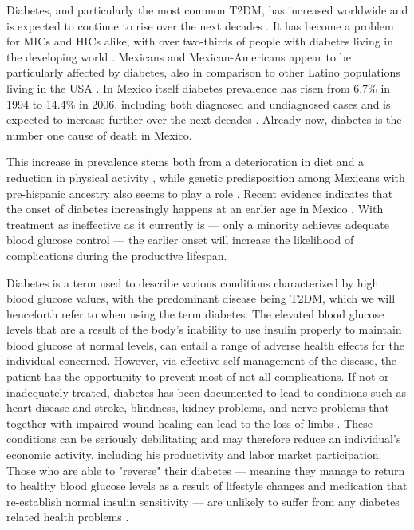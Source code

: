 \documentclass[12pt,english]{article}
\begin{document}
Diabetes, and particularly the most common \ac{T2DM}, has increased worldwide and is expected to continue to rise over the next decades \parencite{Risk2016}. It has become a problem for \ac{MICs} and \ac{HICs} alike, with over two-thirds of people with diabetes living in the developing world \parencite{InternationalDiabetesFederation2013}. Mexicans and Mexican-Americans appear to be particularly affected by diabetes, also in comparison to other Latino populations living in the \ac{USA} \parencite{Schneiderman2014}. In Mexico itself diabetes prevalence has risen from 6.7\% in 1994 to 14.4\% in 2006, including both diagnosed and undiagnosed cases \parencite{Barquera2013} and is expected to increase further over the next decades \parencite{Meza2015}. Already now, diabetes is the number one cause of death in Mexico. 

This increase in prevalence stems both from a deterioration in diet and a reduction in physical activity \parencite{Barquera2008b,Basu2013}, while genetic predisposition among Mexicans with pre-hispanic ancestry also seems to play a role \parencite{Williams2013}. Recent evidence indicates that the onset of diabetes increasingly happens at an earlier age in Mexico \parencite{Villalpando2010}. With treatment as ineffective as it currently is --- only a minority achieves adequate blood glucose control  \parencite{Barquera2013} --- the earlier onset will increase the likelihood of complications during the productive lifespan. 

Diabetes is a term used to describe various conditions characterized by high blood glucose values, with the predominant disease being \ac{T2DM}, which we will henceforth refer to when using the term diabetes. The elevated
blood glucose levels that are a result of the body's inability to use insulin properly to maintain blood glucose at normal levels, can entail a range of adverse health effects for the individual concerned. However, via effective self-management of the disease, the patient has the opportunity to prevent most of not all complications.   If not or inadequately treated, diabetes has been documented to lead to conditions such as heart  disease and stroke, blindness, kidney problems, and nerve problems that together with impaired wound healing can lead to the loss of limbs \parencite{Reynoso-Noveron2011}. These conditions can be seriously debilitating and may therefore reduce an individual's economic activity, including his productivity and labor market participation.  Those who are able to "reverse" their diabetes --- meaning they manage to return to healthy blood glucose levels as a result of lifestyle changes and medication that re-establish normal insulin sensitivity --- are unlikely to suffer from any diabetes related health problems \parencite{Lim2011, Gregg2012}.
\end{document}
